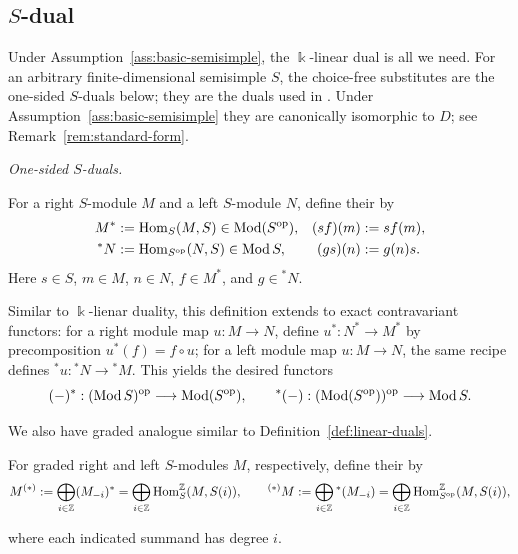 \begin{advanced}[suppressfirstparskip=true,innertopmargin=0pt]
\subsection{$S$-dual}

Under Assumption~\ref{ass:basic-semisimple}, the $\Bbbk$-linear dual is all we need.
For an arbitrary finite-dimensional semisimple $S$, the choice-free substitutes are the one-sided $S$-duals below; they are the duals used in \cite[\S2.7]{BGS96}.
Under Assumption~\ref{ass:basic-semisimple} they are canonically isomorphic to $D$; see Remark~\ref{rem:standard-form}.

\emph{One-sided $S$-duals.}

\begin{definition}\label{def:S-duals}
For a right $S$-module $M$ and a left $S$-module $N$, define their  by
\[
\begin{aligned}
M^*&:=\operatorname{Hom}\nolimits_S(M,S)\in \operatorname{\mathrm{Mod}}(S^{\mathrm{op}}),&
(sf)(m)&:=sf(m),\\
{}^*N&:=\operatorname{Hom}\nolimits_{S^{\mathrm{op}}}(N,S) \in \operatorname{\mathrm{Mod}} S,&
(gs)(n)&:=g(n)s.
\end{aligned}
\]
Here $s\in S$, $m\in M$, $n\in N$, $f\in M^*$, and $g\in{}^*N$.
\end{definition}


Similar to $\Bbbk$-lienar duality, this definition extends to exact contravariant functors: for a right module map $u:M\to N$, define $u^*:N^*\to M^*$ by precomposition $u^*(f)=f\circ u$; for a left module map $u:M\to N$, the same recipe defines ${}^*u:{}^*N\to{}^*M$.
This yields the desired functors
\[
(-)^*:(\operatorname{\mathrm{Mod}} S)^{\mathrm{op}}\longrightarrow\operatorname{\mathrm{Mod}}(S^{\mathrm{op}}),
\qquad
{}^*(-):(\operatorname{\mathrm{Mod}}(S^{\mathrm{op}}))^{\mathrm{op}}\longrightarrow\operatorname{\mathrm{Mod}} S.
\]

We also have graded analogue similar to Definition~\ref{def:linear-duals}.

\begin{definition}\label{def:graded-S-duals}
For graded right and left $S$-modules $M$, respectively, define their  by
\[
M^{(*)}:=\bigoplus_{i\in\mathbb{Z}}(M_{-i})^*
=\bigoplus_{i\in\mathbb{Z}}\operatorname{Hom}\nolimits_S^{\mathbb{Z}}(M,S(i)),\qquad
{}^{(*)}M:=\bigoplus_{i\in\mathbb{Z}}{}^*(M_{-i})=\bigoplus_{i\in\mathbb{Z}}\operatorname{Hom}\nolimits_{S^{\mathrm{op}}}^{\mathbb{Z}}(M,S(i)),
\]

where each indicated summand has degree $i$.
\end{definition}


\end{advanced}
